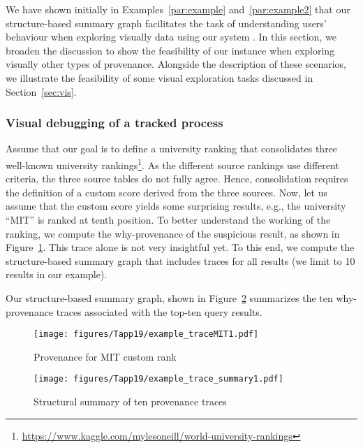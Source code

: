 
We have shown initially in Examples~\ref{par:example} and~\ref{par:example2} that our structure-based summary graph facilitates the task of understanding users' behaviour when exploring visually data using our system \prototype{}.
In this section, we broaden the discussion to show the feasibility of our instance when exploring visually other types of provenance.
Alongside the description of these scenarios, we illustrate the feasibility of some visual exploration tasks discussed in Section~\ref{sec:vis}.  


\subsubsection{Visual debugging of a tracked process}

Assume that our goal is to define a university ranking that consolidates three well-known university rankings\footnote{\url{https://www.kaggle.com/mylesoneill/world-university-rankings}}. As the different source rankings use different criteria, the three source tables do not fully agree. Hence, consolidation requires the definition of a custom score derived from the three sources. Now, let us assume that the custom score yields some surprising results, e.g., the university ``MIT''  is ranked at tenth position. To better understand the working of the ranking, we compute the why-provenance of the suspicious result, as shown in Figure~\ref{fig:universityX1}.
This trace alone is not very insightful yet. To this end, we compute the structure-based summary graph that  includes traces for all results (we limit to 10 results in our example). 


Our structure-based summary graph, shown in Figure~\ref{fig:Inf-type-university1} %
summarizes the ten why-provenance traces associated with the top-ten query results. 
\begin{figure}[t]
\center
\texttt{[image: figures/Tapp19/example\_traceMIT1.pdf]}
\caption{Provenance for MIT custom rank}
\label{fig:universityX1}
\end{figure}
\begin{figure}[t]
\center
\texttt{[image: figures/Tapp19/example\_trace\_summary1.pdf]}
\caption{Structural summary of ten provenance traces}
\label{fig:Inf-type-university1}
\end{figure}


